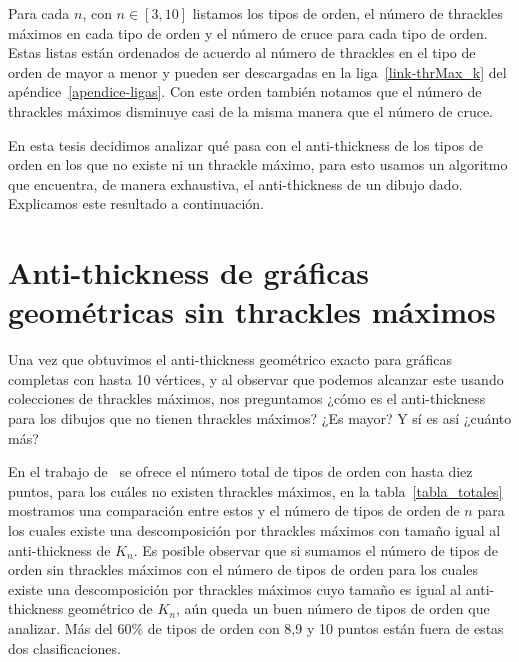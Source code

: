     Para cada $n$, con $n \in [3,10]$ listamos los tipos de orden, el número de thrackles máximos en
    cada tipo de orden y el número de cruce para cada tipo de orden. Estas listas están ordenados de
    acuerdo al número de thrackles en el tipo de orden de mayor a menor y pueden ser descargadas en
    la liga~\ref{link-thrMax_k} del apéndice~\ref{apendice-ligas}. Con este orden también notamos
    que el número de thrackles máximos disminuye casi de la misma manera que el número de cruce.

    En esta tesis decidimos analizar qué pasa con el anti-thickness de los tipos de orden en los que
    no existe ni un thrackle máximo, para esto usamos un algoritmo que encuentra, de manera
    exhaustiva, el anti-thickness de un dibujo dado. Explicamos este resultado a continuación.

\section{Anti-thickness de gráficas geométricas sin thrackles máximos}

  Una vez que obtuvimos el anti-thickness geométrico exacto para gráficas completas con hasta 10
  vértices, y al observar que podemos alcanzar este usando colecciones de thrackles máximos, nos
  preguntamos ¿cómo es el anti-thickness para los dibujos que no tienen thrackles máximos? ¿Es
  mayor? Y sí es así ¿cuánto más?

  En el trabajo de~\cite{Bulnes2017} se ofrece el número total de
  tipos de orden con hasta diez puntos, para los cuáles no existen thrackles máximos, en la
  tabla~\ref{tabla_totales} mostramos una comparación entre estos y el número de tipos de orden de
  $n$ para los cuales existe una descomposición por thrackles máximos con tamaño igual al
  anti-thickness de $K_n$. Es posible observar que si sumamos el número de tipos de orden sin
  thrackles máximos con el número de tipos de orden para los cuales existe una descomposición por
  thrackles máximos cuyo tamaño es igual al anti-thickness geométrico de $K_n$, aún queda un buen
  número de tipos de orden que analizar. Más del 60\% de tipos de orden con 8,9 y 10 puntos están
  fuera de estas dos clasificaciones.

